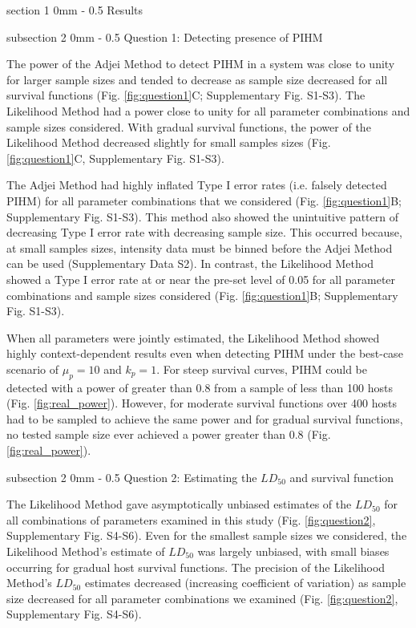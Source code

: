 \documentclass[12pt, a4paper]{article}
\makeatletter
\renewcommand{\section}{\@startsection
{section}%
{1}%
{0mm}%
{-\baselineskip}%
{0.5\baselineskip}%
{\normalfont\bf\large}} %
\renewcommand{\subsection}{\@startsection
{subsection}%
{2}%
{0mm}%
{-\baselineskip}%
{0.5\baselineskip}%
{\normalfont\bf}} %
\makeatother
\begin{document}
\section{Results}

\subsection{Question 1: Detecting presence of PIHM}

The power of the Adjei Method to detect PIHM in a
system was close to unity for larger sample sizes and tended to
decrease as sample size decreased for all survival functions (Fig. \ref{fig:question1}C; Supplementary Fig. S1-S3).  The Likelihood Method had a power close to
unity for all parameter combinations and sample sizes considered.  With gradual
survival functions, the power of the Likelihood Method decreased slightly for small samples sizes (Fig. \ref{fig:question1}C, Supplementary Fig. S1-S3).

The Adjei Method had highly inflated Type I error rates (i.e. falsely detected
PIHM) for all parameter combinations that we
considered (Fig. \ref{fig:question1}B; Supplementary Fig. S1-S3).  This method also showed the unintuitive pattern of decreasing Type I error
rate with decreasing sample size.  This occurred because, at small samples sizes, intensity data must be binned before the Adjei Method can be used (Supplementary Data S2).  In contrast, the Likelihood Method showed a Type I
error rate at or near the pre-set level of 0.05 for all parameter combinations
and sample sizes considered (Fig. \ref{fig:question1}B; Supplementary Fig. S1-S3).

When all parameters were jointly estimated, the Likelihood Method showed highly
context-dependent results even when detecting PIHM under the best-case scenario of
$\mu_p = 10$ and $k_p = 1$. For steep survival curves, PIHM could be detected with a power of greater than 0.8 from a sample of less than 100 hosts (Fig. \ref{fig:real_power}). However, for moderate survival functions over 400 hosts had to be sampled to achieve the same power and for gradual survival functions, no tested sample size ever achieved a power greater than 0.8 (Fig. \ref{fig:real_power}).

\subsection{Question 2: Estimating the $LD_{50}$ and survival function}

The Likelihood Method gave asymptotically unbiased estimates of the $LD_{50}$
for all combinations of parameters examined in this study (Fig. \ref{fig:question2}, Supplementary Fig. S4-S6).  Even for
the smallest sample sizes we considered, the Likelihood Method's estimate of $LD_{50}$
was largely unbiased, with small biases occurring for gradual host survival functions. The precision of the Likelihood Method's $LD_{50}$ estimates decreased
(increasing coefficient of variation) as sample size decreased for all
parameter combinations we examined (Fig. \ref{fig:question2}, Supplementary Fig. S4-S6).
\end{document}
